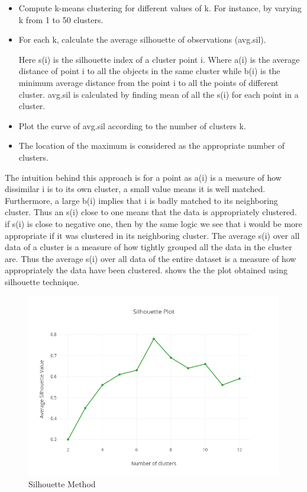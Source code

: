 	\begin{itemize}
		\item Compute k-means clustering for different values of k. For instance, by varying k from 1 to 50 clusters.
		\item For each k, calculate the average silhouette of observations (avg.sil).
		
		\begin{center}
		\end{center}
		Here s(i) is the silhouette index of a cluster point i. Where a(i) is the average distance of point i to all the objects in the same cluster while b(i) is the minimum average distance from the point i to all the points of different cluster. avg.sil is calculated by finding mean of all the s(i) for each point in a cluster.
		
		\item Plot the curve of avg.sil according to the number of clusters k.
		\item The location of the maximum is considered as the appropriate number of clusters.
	\end{itemize}
 
  The intuition behind this approach is for a point as a(i) is a measure of how dissimilar i is to its own cluster, a small value means it is well matched. Furthermore, a large b(i) implies that i is badly matched to its neighboring cluster. Thus an s(i) close to one means that the data is appropriately clustered. if s(i) is close to negative one, then by the same logic we see that i would be more appropriate if it was clustered in its neighboring cluster. The average s(i) over all data of a cluster is a measure of how tightly grouped all the data in the cluster are. Thus the average s(i) over all data of the entire dataset is a measure of how appropriately the data have been clustered.  shows the the plot obtained using silhouette technique. 
 
 \begin{figure}[ht]
 	\centerline{\includegraphics[scale = 0.6]{silhouette.png}}
 	\caption{Silhouette Method}%
 \end{figure}
 
